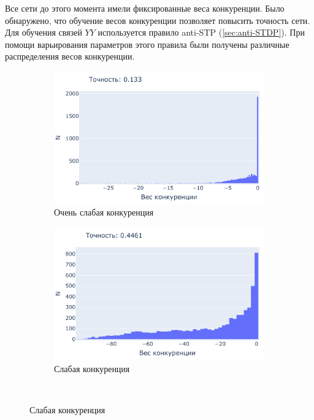 \documentclass[a4paper]{article}
\begin{document}
Все сети до этого момента имели фиксированные веса конкуренции. Было обнаружено, что обучение весов конкуренции позволяет повысить точность сети. Для обучения связей $YY$ используется правило anti-STP (\autoref{sec:anti-STDP}). При помощи варьирования параметров этого правила были получены различные распределения весов конкуренции.

\begin{figure}[H]
\centering
\begin{subfigure}{0.45\textwidth}
    \includegraphics[width=\textwidth,keepaspectratio=true]{competition_distribution_worst_ru.pdf}
    \caption{Очень слабая конкуренция}
\end{subfigure}
\begin{subfigure}{0.45\textwidth}
    \includegraphics[width=\textwidth,keepaspectratio=true]{competition_distribution_medium_bad_ru.pdf}
    \caption{Слабая конкуренция}
\end{subfigure}
\\

\end{figure}
\end{document}
